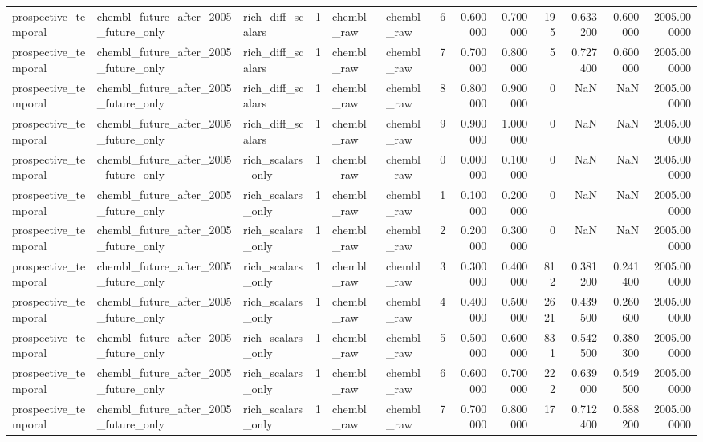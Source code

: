 \begin{longtable}{lllrllrrrrrrr}
prospective\_temporal & chembl\_future\_after\_2005\_future\_only & rich\_diff\_scalars & 1 & chembl\_raw & chembl\_raw & 6 & 0.600000 & 0.700000 & 195 & 0.633200 & 0.600000 & 2005.000000 \\
prospective\_temporal & chembl\_future\_after\_2005\_future\_only & rich\_diff\_scalars & 1 & chembl\_raw & chembl\_raw & 7 & 0.700000 & 0.800000 & 5 & 0.727400 & 0.600000 & 2005.000000 \\
prospective\_temporal & chembl\_future\_after\_2005\_future\_only & rich\_diff\_scalars & 1 & chembl\_raw & chembl\_raw & 8 & 0.800000 & 0.900000 & 0 & NaN & NaN & 2005.000000 \\
prospective\_temporal & chembl\_future\_after\_2005\_future\_only & rich\_diff\_scalars & 1 & chembl\_raw & chembl\_raw & 9 & 0.900000 & 1.000000 & 0 & NaN & NaN & 2005.000000 \\
prospective\_temporal & chembl\_future\_after\_2005\_future\_only & rich\_scalars\_only & 1 & chembl\_raw & chembl\_raw & 0 & 0.000000 & 0.100000 & 0 & NaN & NaN & 2005.000000 \\
prospective\_temporal & chembl\_future\_after\_2005\_future\_only & rich\_scalars\_only & 1 & chembl\_raw & chembl\_raw & 1 & 0.100000 & 0.200000 & 0 & NaN & NaN & 2005.000000 \\
prospective\_temporal & chembl\_future\_after\_2005\_future\_only & rich\_scalars\_only & 1 & chembl\_raw & chembl\_raw & 2 & 0.200000 & 0.300000 & 0 & NaN & NaN & 2005.000000 \\
prospective\_temporal & chembl\_future\_after\_2005\_future\_only & rich\_scalars\_only & 1 & chembl\_raw & chembl\_raw & 3 & 0.300000 & 0.400000 & 812 & 0.381200 & 0.241400 & 2005.000000 \\
prospective\_temporal & chembl\_future\_after\_2005\_future\_only & rich\_scalars\_only & 1 & chembl\_raw & chembl\_raw & 4 & 0.400000 & 0.500000 & 2621 & 0.439500 & 0.260600 & 2005.000000 \\
prospective\_temporal & chembl\_future\_after\_2005\_future\_only & rich\_scalars\_only & 1 & chembl\_raw & chembl\_raw & 5 & 0.500000 & 0.600000 & 831 & 0.542500 & 0.380300 & 2005.000000 \\
prospective\_temporal & chembl\_future\_after\_2005\_future\_only & rich\_scalars\_only & 1 & chembl\_raw & chembl\_raw & 6 & 0.600000 & 0.700000 & 222 & 0.639000 & 0.549500 & 2005.000000 \\
prospective\_temporal & chembl\_future\_after\_2005\_future\_only & rich\_scalars\_only & 1 & chembl\_raw & chembl\_raw & 7 & 0.700000 & 0.800000 & 17 & 0.712400 & 0.588200 & 2005.000000 \\

\end{longtable}
